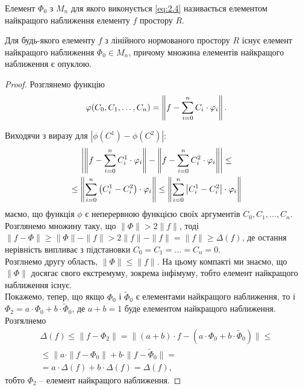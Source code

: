 \begin{definition}
	Елемент $\Phi_0$ з $M_n$ для якого виконується \eqref{eq:2.4} називається елементом найкращого наближення елементу $f$ простору $R$.
\end{definition}

\begin{theorem}
	Для будь-якого елементу $f$ з лінійного нормованого простору $R$ існує елемент найкращого наближення $\Phi_0 \in M_n$, причому множина елементів найкращого наближення є опуклою. 
\end{theorem}

\begin{proof}
	Розглянемо функцію
	\begin{equation}
		\label{eq:2.5}
		\varphi(C_0, C_1, \ldots, C_n) = \left\| f - \displaystyle\sum\limits_{i = 0}^n C_i \cdot \varphi_i \right\|.
	\end{equation}

	Виходячи з виразу для $|\phi(C^1) - \phi(C^2)|$:
	\begin{multline}
		\label{eq:2.6}
		\left| \left\| f - \displaystyle\sum\limits_{i = 0}^n C_i^1 \cdot \varphi_i \right\| - \left\| f - \displaystyle\sum\limits_{i = 0}^n C_i^2 \cdot \varphi_i \right\| \right| \le \\ \le \left\| \displaystyle\sum\limits_{i = 0}^n \left(C_i^1 - C_i^2\right) \cdot \varphi_i \right\| \le \left\| \displaystyle\sum\limits_{i = 0}^n \left|C_i^1 - C_i^2\right| \cdot \varphi_i \right\|
	\end{multline}
	маємо, що функція $\phi$ є неперервною функцією своїх аргументів $C_0, C_1, \ldots, C_n$. \\

	Розглянемо множину таку, що $\| \Phi \| > 2 \| f \|$, тоді $\| f - \Phi \| \ge \| \Phi \| - \| f \| > 2 \| f \| - \| f \| = \| f \| \ge \Delta (f)$, де остання нерівність випливає з підстановки $C_0 = C_1 = \ldots = C_n = 0$. \\

	Розглнемо другу область, $\| \Phi \| \le \| f \|$. На цьому компакті ми знаємо, що $\| \Phi \|$ досягає свого екстремуму, зокрема інфімуму, тобто елемент найкращого наближення існує. \\

	Покажемо, тепер, що якщо $\Phi_0$ і $\tilde \Phi_0$ є елементами найкращого наближення, то і $\Phi_2 = a \cdot \Phi_0 + b \cdot \tilde \Phi_0$, де $a + b = 1$ буде елементом найкращого наближення. \\

	Розгялнемо 
	\begin{multline}
		\label{eq:2.7}
		\Delta(f) \le \| f - \Phi_2 \| = \| (a + b) \cdot f - (a \cdot \Phi_0 + b \cdot \tilde \Phi_0) \| \le \\ \le \| a \cdot \| f - \Phi_0 \| + b \cdot \| f - \tilde \Phi_0 \| = \\ = a \cdot \Delta(f) + b \cdot \Delta(f) = \Delta(f),
	\end{multline}
	тобто $\Phi_2$ -- елемент найкращого наближення.
\end{proof}

